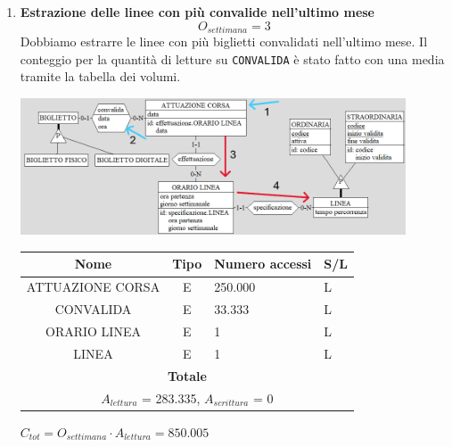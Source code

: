\documentclass[12pt,a4paper]{report}
\begin{document}
\begin{enumerate}[label=\textbf{\arabic*)}]
    \item \textbf{Estrazione delle linee con più convalide nell'ultimo mese} \label{op6} \\
    \[ {O_{settimana} = 3} \]
    Dobbiamo estrarre le linee con più biglietti convalidati nell'ultimo mese. Il conteggio per la quantità di letture su \texttt{CONVALIDA} è stato fatto con una media tramite la tabella dei volumi.
    \begin{center}
	\includegraphics[width=0.9\textwidth]{op_6}
	\end{center}
    \begin{table}[H]
    \centering
    \begin{tabular}{|c|c|l|l|}
    \hline
    \textbf{Nome} & \textbf{Tipo} & \textbf{Numero accessi} & \textbf{S/L} \\
    \hline
    ATTUAZIONE CORSA & E & 250.000 & L \\
    \hline
    CONVALIDA & E & 33.333 & L \\
    \hline
    ORARIO LINEA & E & 1 & L \\
    \hline
    LINEA & E & 1 & L \\
    \hline
    \multicolumn{4}{c}{\textbf{Totale}} \\
    \multicolumn{4}{c}{${A_{lettura}}$ = 283.335, ${A_{scrittura}}$ = 0} \\
    \hline
    \end{tabular}
    \end{table}
    \begin{center}
    ${C_{tot} = {O_{settimana}}\cdot {A_{lettura}} = 850.005}$
    \end{center}



\end{enumerate}
\end{document}
